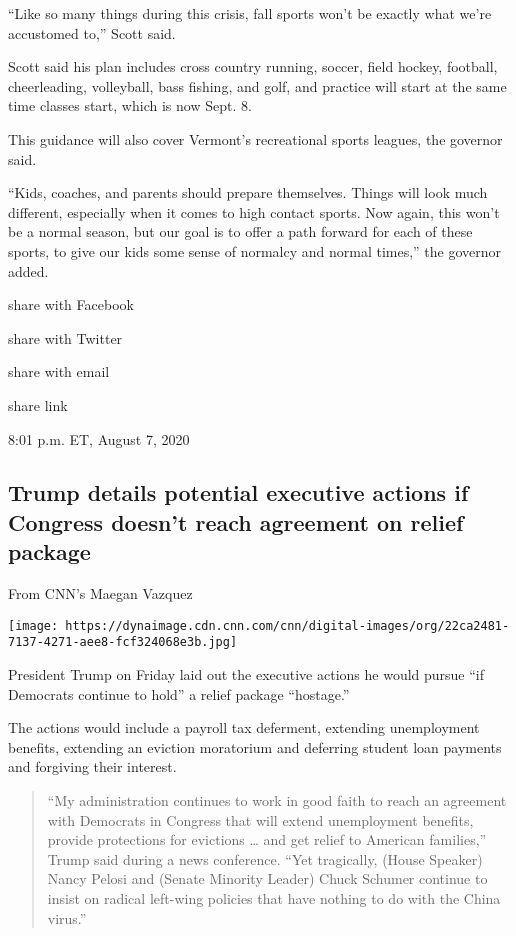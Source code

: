 ``Like so many things during this crisis, fall sports won't be exactly
what we're accustomed to,'' Scott said.

Scott said his plan includes cross country running, soccer, field
hockey, football, cheerleading, volleyball, bass fishing, and golf, and
practice will start at the same time classes start, which is now Sept.
8.

This guidance will also cover Vermont's recreational sports leagues, the
governor said.~

``Kids, coaches, and parents should prepare themselves. Things will look
much different, especially when it comes to high contact sports. Now
again, this won't be a normal season, but our goal is to offer a path
forward for each of these sports, to give our kids some sense of
normalcy and normal times,'' the governor added.

share with Facebook

share with Twitter

share with email

share link

8:01 p.m. ET, August 7, 2020

\hypertarget{trump-details-potential-executive-actions-if-congress-doesnt-reach-agreement-on-relief-package}{%
\subsection{Trump details potential executive actions if Congress
doesn't reach agreement on relief
package}\label{trump-details-potential-executive-actions-if-congress-doesnt-reach-agreement-on-relief-package}}

From CNN's Maegan Vazquez~

\texttt{[image: https://dynaimage.cdn.cnn.com/cnn/digital-images/org/22ca2481-7137-4271-aee8-fcf324068e3b.jpg]}

President Trump on Friday laid out the executive actions he would pursue
``if Democrats continue to hold'' a relief package ``hostage.''

The actions would include a payroll tax deferment, extending
unemployment benefits, extending an eviction moratorium and deferring
student loan payments and forgiving their interest.

\begin{quote}
``My administration continues to work in good faith to reach an
agreement with Democrats in Congress that will extend unemployment
benefits, provide protections for evictions \ldots{} and get relief to
American families,'' Trump said during a news conference. ``Yet
tragically, (House Speaker) Nancy Pelosi and (Senate Minority Leader)
Chuck Schumer continue to insist on radical left-wing policies that have
nothing to do with the China virus.''
\end{quote}

